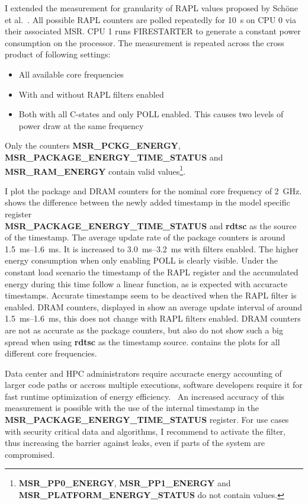 I extended the measurement for granularity of RAPL values proposed by Schöne et al.~\cite{Schoene_2024_Alder_Lake}.
All possible RAPL counters are polled repeatedly for \SI{10}{\s} on CPU 0 via their associated MSR.
CPU 1 runs FIRESTARTER to generate a constant power consumption on the processor.
The measurement is repeated across the cross product of following settings:
\begin{itemize}
    \item All available core frequencies
    \item With and without RAPL filters enabled
    \item Both with all C-states and only POLL enabled.
    This causes two levels of power draw at the same frequency
\end{itemize}
Only the counters \textbf{MSR\_PCKG\_ENERGY}, \textbf{MSR\_PACKAGE\_ENERGY\_TIME\_STATUS} and\\ \textbf{MSR\_RAM\_ENERGY} contain valid values\footnote{\textbf{MSR\_PP0\_ENERGY}, \textbf{MSR\_PP1\_ENERGY} and \textbf{MSR\_PLATFORM\_ENERGY\_STATUS} do not contain values.}.

I plot the package and DRAM counters for the nominal core frequency of \SI{2}{\GHz}.
 shows the difference between the newly added timestamp in the model specific register\\ \textbf{MSR\_PACKAGE\_ENERGY\_TIME\_STATUS} and \textbf{rdtsc} as the source of the timestamp.
The average update rate of the package counters is around \SI{1.5}{\ms}--\SI{1.6}{\ms}.
It is increased to \SI{3.0}{\ms}--\SI{3.2}{\ms} with filters enabled.
The higher energy consumption when only enabling POLL is clearly visible.
Under the constant load scenario the timestamp of the RAPL register and the accumulated energy during this time follow a linear function, as is expected with accuracte timestamps.
Accurate timestamps seem to be deactived when the RAPL filter is enabled.
DRAM counters, displayed in  show an average update interval of around \SI{1.5}{\ms}--\SI{1.6}{\ms}, this does not change with RAPL filters enabled.
DRAM counters are not as accurate as the package counters, but also do not show such a big spread when using \textbf{rdtsc} as the timestamp source.
 contains the plots for all different core frequencies.

Data center and HPC administrators require accuracte energy accounting of larger code paths or accross multiple executions, software developers require it for fast runtime optimization of energy efficiency.~\cite{Gocht_2019_QLearning,Haehnel_2012_RAPL}
An increased accuracy of this measurement is possible with the use of the internal timestamp in the \textbf{MSR\_PACKAGE\_ENERGY\_TIME\_STATUS} register.
For use cases with security critical data and algorithms, I recommend to activate the filter, thus increasing the barrier against leaks, even if parts of the system are compromised.

